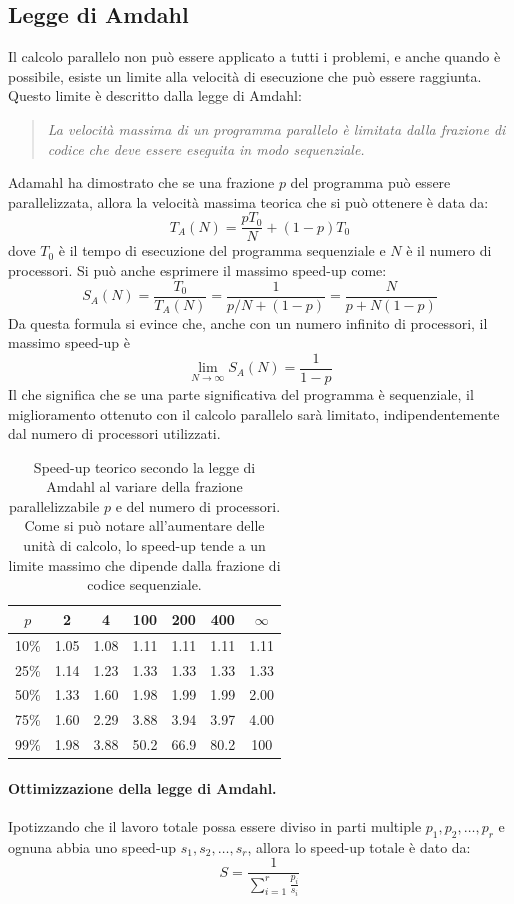 \subsection{Legge di Amdahl}
Il calcolo parallelo non può essere applicato a tutti i problemi, e anche quando è possibile, esiste un limite alla velocità di esecuzione che può essere raggiunta. Questo limite è descritto dalla legge di Amdahl:

\begin{quote}
\textit{La velocità massima di un programma parallelo è limitata dalla frazione di codice che deve essere eseguita in modo sequenziale.}
\end{quote}
Adamahl ha dimostrato che se una frazione $p$ del programma può essere parallelizzata, allora la velocità massima teorica che si può ottenere è data da:
\[
T_A(N) = \frac{p T_0}{N} + (1-p) T_0
\]
dove $T_0$ è il tempo di esecuzione del programma sequenziale e $N$ è il numero di processori. Si può anche esprimere il massimo speed-up come:
\[
S_A(N) = \frac{T_0}{T_A(N)} = \frac{1}{p/N + (1-p)} = \frac{N}{p + N(1-p)}
\]
Da questa formula si evince che, anche con un numero infinito di processori, il massimo speed-up è
\[
\lim_{N \to \infty} S_A(N) = \frac{1}{1-p}
\]
Il che significa che se una parte significativa del programma è sequenziale, il miglioramento ottenuto con il calcolo parallelo sarà limitato, indipendentemente dal numero di processori utilizzati.

\begin{table}[h]
\centering
\begin{tabular}{c|cccccc}
$p$ & 2 & 4 & 100 & 200 & 400 & $\infty$ \\
\hline
10\% & 1.05 & 1.08 & 1.11 & 1.11 & 1.11 & 1.11 \\
25\% & 1.14 & 1.23 & 1.33 & 1.33 & 1.33 & 1.33 \\
50\% & 1.33 & 1.60 & 1.98 & 1.99 & 1.99 & 2.00 \\
75\% & 1.60 & 2.29 & 3.88 & 3.94 & 3.97 & 4.00 \\
99\% & 1.98 & 3.88 & 50.2 & 66.9 & 80.2 & 100 \\
\end{tabular}
\caption{Speed-up teorico secondo la legge di Amdahl al variare della frazione parallelizzabile $p$ e del numero di processori. Come si può notare all'aumentare delle unità di calcolo, lo speed-up tende a un limite massimo che dipende dalla frazione di codice sequenziale.}
\end{table}

\paragraph{Ottimizzazione della legge di Amdahl.}
Ipotizzando che il lavoro totale possa essere diviso in parti multiple $p_1, p_2, \dots, p_r$ e ognuna abbia uno speed-up $s_1, s_2, \dots, s_r$, allora lo speed-up totale è dato da:
\[
S = \frac{1}{\sum_{i=1}^r \frac{p_i}{s_i}}
\]

